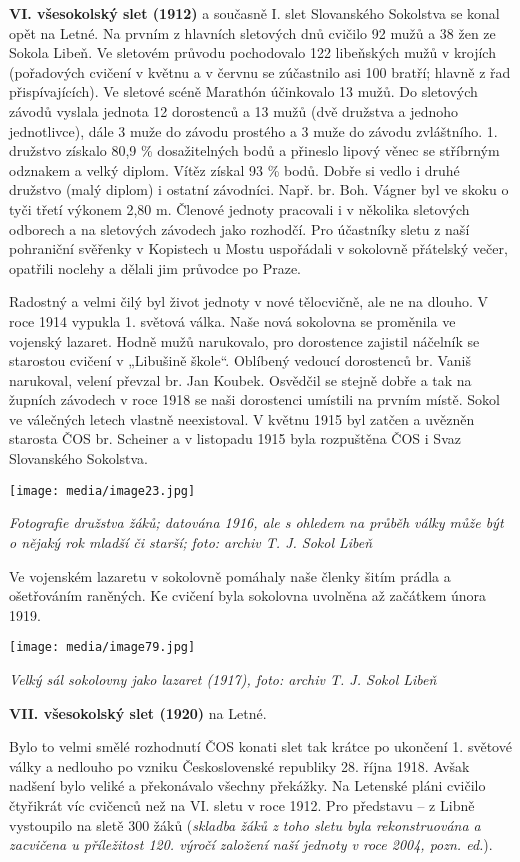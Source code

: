 \textbf{VI. všesokolský slet (1912)} a současně I. slet Slovanského
Sokolstva se konal opět na Letné. Na prvním z hlavních sletových dnů
cvičilo 92 mužů a 38 žen ze Sokola Libeň. Ve sletovém průvodu
pochodovalo 122 libeňských mužů v krojích (pořadových cvičení v květnu a
v červnu se zúčastnilo asi 100 bratří; hlavně z řad přispívajících). Ve
sletové scéně Marathón účinkovalo 13 mužů. Do sletových závodů vyslala
jednota 12 dorostenců a 13 mužů (dvě družstva a jednoho jednotlivce),
dále 3 muže do závodu prostého a 3 muže do závodu zvláštního. 1.
družstvo získalo 80,9 \% dosažitelných bodů a přineslo lipový věnec se
stříbrným odznakem a velký diplom. Vítěz získal 93 \% bodů. Dobře si
vedlo i druhé družstvo (malý diplom) i ostatní závodníci. Např. br. Boh.
Vágner byl ve skoku o tyči třetí výkonem 2,80 m. Členové jednoty
pracovali i v několika sletových odborech a na sletových závodech jako
rozhodčí. Pro účastníky sletu z naší pohraniční svěřenky v Kopistech u
Mostu uspořádali v sokolovně přátelský večer, opatřili noclehy a dělali
jim průvodce po Praze.

Radostný a velmi čilý byl život jednoty v nové tělocvičně, ale ne na
dlouho. V roce 1914 vypukla 1. světová válka. Naše nová sokolovna se
proměnila ve vojenský lazaret. Hodně mužů narukovalo, pro dorostence
zajistil náčelník se starostou cvičení v „Libušině škole``. Oblíbený
vedoucí dorostenců br. Vaniš narukoval, velení převzal br. Jan Koubek.
Osvědčil se stejně dobře a tak na župních závodech v roce 1918 se naši
dorostenci umístili na prvním místě. Sokol ve válečných letech vlastně
neexistoval. V květnu 1915 byl zatčen a uvězněn starosta ČOS br.
Scheiner a v listopadu 1915 byla rozpuštěna ČOS i Svaz Slovanského
Sokolstva.

\texttt{[image: media/image23.jpg]}

\emph{Fotografie družstva žáků; datována 1916, ale s ohledem na průběh
války může být o nějaký rok mladší či starší;} \emph{foto: archiv T. J.
Sokol Libeň}

Ve vojenském lazaretu v sokolovně pomáhaly naše členky šitím prádla a
ošetřováním raněných. Ke cvičení byla sokolovna uvolněna až začátkem
února 1919.

\texttt{[image: media/image79.jpg]}

\emph{Velký sál sokolovny jako lazaret (1917), foto: archiv T. J. Sokol
Libeň}

\textbf{VII. všesokolský slet (1920)} na Letné.

Bylo to velmi smělé rozhodnutí ČOS konati slet tak krátce po ukončení 1.
světové války a nedlouho po vzniku Československé republiky 28. října
1918. Avšak nadšení bylo veliké a překonávalo všechny překážky. Na
Letenské pláni cvičilo čtyřikrát víc cvičenců než na VI. sletu v roce
1912. Pro představu -- z Libně vystoupilo na sletě 300 žáků
(\emph{skladba žáků z toho sletu byla rekonstruována a zacvičena u
příležitost 120. výročí založení naší jednoty v roce 2004, pozn. ed.}).


